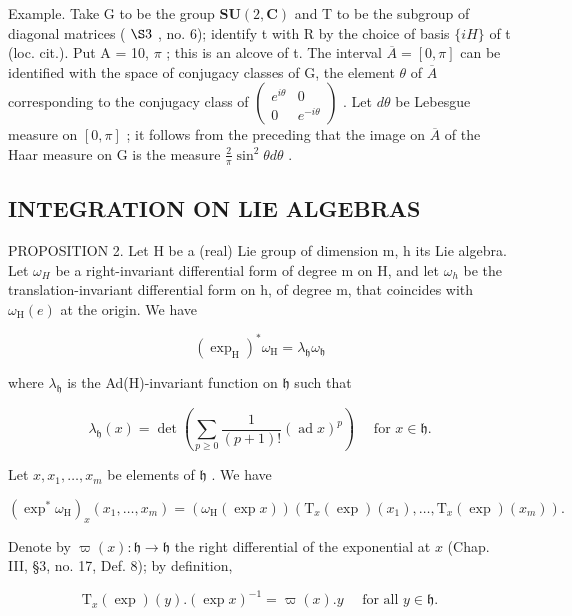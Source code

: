 Example. Take G to be the group \(\mathbf{SU}(2,\mathbf{C})\) and T to be the subgroup of diagonal matrices ( \(\S3\) , no. 6); identify t with R by the choice of basis \(\{iH\}\) of t (loc. cit.). Put A = 10, \(\pi\) ; this is an alcove of t. The interval \(\overline{A} = [0, \pi]\) can be identified with the space of conjugacy classes of G, the element \(\theta\) of \(\overline{A}\) corresponding to the conjugacy class of \(\begin{pmatrix} e^{i\theta} & 0 \\ 0 & e^{-i\theta} \end{pmatrix}\) . Let \(d\theta\) be Lebesgue measure on \([0, \pi]\) ; it follows from the preceding that the image on \(\overline{A}\) of the Haar measure on G is the measure \(\frac{2}{\pi}\sin^{2}\theta d\theta\) .

\subsection{INTEGRATION ON LIE ALGEBRAS}

PROPOSITION 2. Let H be a (real) Lie group of dimension m, h its Lie algebra. Let \(\omega_{H}\) be a right-invariant differential form of degree m on H, and let \(\omega_{h}\) be the translation-invariant differential form on h, of degree m, that coincides with \(\omega_{\mathrm{H}}(e)\) at the origin. We have

\[
(\exp_ {\mathrm{H}}) ^ {*} \omega_ {\mathrm{H}} = \lambda_ {\mathfrak {h}} \omega_ {\mathfrak {h}}\tag{10}
\]

where \(\lambda_{\mathfrak{h}}\) is the Ad(H)-invariant function on \(\mathfrak{h}\) such that

\[
\lambda_ {\mathfrak {h}} (x) = \det \left(\sum_ {p \geq 0} \frac {1}{(p + 1) !} (\operatorname{ad} x) ^ {p}\right) \quad \text { for } x \in \mathfrak {h}.
\]

Let \(x, x_1, \ldots, x_m\) be elements of \(\mathfrak{h}\) . We have

\[
(\exp^ {*} \omega_ {\mathrm{H}}) _ {x} (x _ {1}, \dots , x _ {m}) = (\omega_ {\mathrm{H}} (\exp x)) (\mathrm{T} _ {x} (\exp) (x _ {1}), \dots , \mathrm{T} _ {x} (\exp) (x _ {m})).
\]

Denote by \(\varpi(x) : \mathfrak{h} \to \mathfrak{h}\) the right differential of the exponential at \(x\) (Chap. III, §3, no. 17, Def. 8); by definition,

\[
\mathrm{T} _ {x} (\exp) (y). (\exp x) ^ {- 1} = \varpi (x). y \quad \text { for   all } y \in \mathfrak {h}.
\]

